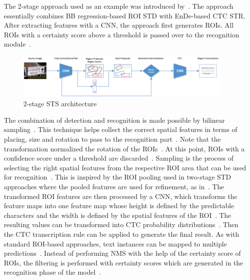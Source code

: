 The 2-stage approach used as an example was introduced by~\cite{busta_deep_2017}.
The approach essentially combines \ac{BB} regression-based \ac{ROI} \ac{STD} with
\ac{EnDe}-based \ac{CTC} \ac{STR}.
After extracting features with a \ac{CNN}, the approach first generates \acp{ROI}.
All \acp{ROI} with a certainty score above a threshold is passed over to the recognition
module~\citep{busta_deep_2017}.
\begin{figure}[hb]
    \centering
    \includegraphics[width=0.95\textwidth]{img/E2E-two-stage-architecture-Bust-Deep-2017.png}
    \caption[2-stage STS architecture]{%
        2-stage STS architecture~\citep{busta_deep_2017}\label{fig:e2e-2-stage}
    }
\end{figure}
The combination of detection and recognition is made possible by bilinear
sampling~\citep{busta_deep_2017}.
This technique helps collect the correct spatial features in terms of placing, size and rotation
to pass to the recognition part~\citep{busta_deep_2017}.
Note that the transformation normalized the rotation of the \acp{ROI}~\citep{busta_deep_2017}.
At this point, \acp{ROI} with a confidence score under a threshold are
discarded~\citep{busta_deep_2017}.
Sampling is the process of selecting the right spatial features from the respective \ac{ROI} area
that can be used for recognition~\citep{liu_abcnet_2020}.
This is inspired by the \ac{ROI} pooling used in two-stage \ac{STD} approaches where the pooled
features are used for refinement, as in~\cite{jiang_r2cnn_2017}.
The transformed \ac{ROI} features are then processed by a \ac{CNN}, which transforms the feature maps
into one feature map whose height is defined by the predictable characters and the width is defined
by the spatial features of the \ac{ROI}~\citep{busta_deep_2017}.
The resulting values can be transformed into \ac{CTC} probability
distributions~\citep{busta_deep_2017,graves_connectionist_2006}.
Then the \ac{CTC} transcription rule can be applied to generate the final result.
As with standard \ac{ROI}-based approaches, text instances can be mapped to multiple
predictions~\citep{ren_faster_2016,busta_deep_2017}.
Instead of performing \ac{NMS} with the help of the certainty score of \acp{ROI}, the filtering
is performed with certainty scores which are generated in the recognition phase of the
model~\citep{busta_deep_2017}.

